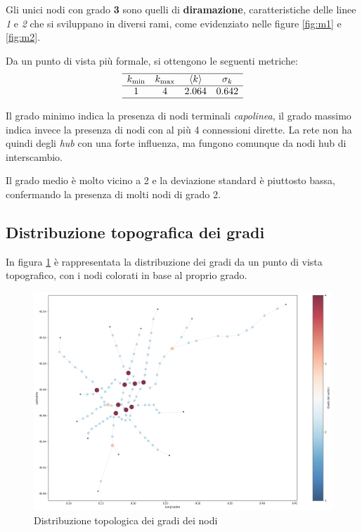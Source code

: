 Gli unici nodi con grado \textbf{3} sono quelli di \textbf{diramazione}, caratteristiche delle linee \textit{1} e \textit{2} che si sviluppano in diversi rami, come evidenziato nelle figure \ref{fig:m1} e \ref{fig:m2}.

Da un punto di vista più formale, si ottengono le seguenti metriche:
\[
\begin{array}{cccc}
\hline
k_{\min} & k_{\max} & \langle k \rangle & \sigma_k \\
\hline
1 & 4 & 2.064 & 0.642 \\
\hline
\end{array}
\]

Il grado minimo indica la presenza di nodi terminali \textit{capolinea}, il grado massimo indica invece la presenza di nodi con al più 4 connessioni dirette. La rete non ha quindi degli \textit{hub} con una forte influenza, ma fungono comunque da nodi hub di interscambio.

Il grado medio è molto vicino a 2 e la deviazione standard è piuttosto bassa, confermando la presenza di molti nodi di grado 2.

\subsection{Distribuzione topografica dei gradi}
In figura \ref{fig: Distribuzione topologica dei gradi dei nodi} è rappresentata la distribuzione dei gradi da un punto di vista topografico, con i nodi colorati in base al proprio grado.

\vspace{1em}
\begin{figure}[h!]
    \centering
    \includegraphics[width=0.8\linewidth]{Immagini//Capitoli//cap3/dist_gradi_mappa.png}
    \caption{Distribuzione topologica dei gradi dei nodi}
    \label{fig: Distribuzione topologica dei gradi dei nodi}
\end{figure}
\vspace{1em}

